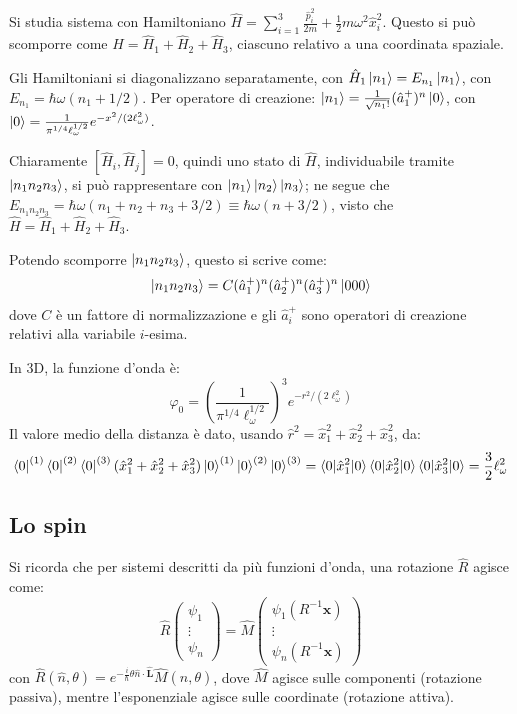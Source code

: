 \documentclass[11pt, a4paper]{scrartcl} %
\numberwithin{equation}{subsection}
\theoremstyle{style2}
\theoremstyle{style1}
\begin{document}
Si studia sistema con Hamiltoniano $\hat{H}= \sum_{i=1}^{3} \frac{\hat{p}_i^2}{2m} + \frac{1}{2} m\omega^2 \hat{x}_i^2$. Questo si pu\`o scomporre come $\hat{H} = \hat{H}_1 + \hat{H}_2 + \hat{H}_3$, ciascuno relativo a una coordinata spaziale.

Gli Hamiltoniani si diagonalizzano separatamente, con $\hat{H}_1 \ket{n_1}  = E_{n_1}  \ket{n_1} $, con $E_{n_1} = \hbar  \omega (n_1 + 1 / 2)$. Per operatore di creazione: $\ket{n_1} = \frac{1}{\sqrt{n_1} !} (\hat{a}_1^{+})^n  \ket{0} $, con $\ket{0}  = \frac{1}{\pi^{ 1/4} \ell _\omega ^{1 / 2}}   e^{ - x^2 / (2 \ell _\omega^{2})} $.

Chiaramente $[\hat{H}_i, \hat{H}_j] = 0$, quindi uno stato di $\hat{H}$, individuabile tramite $\ket{ n_1 n_2n_3} $, si pu\`o rappresentare con $\ket{n_1} \ket{n_2} \ket{n_3} $; ne segue che $E_{n_1n_2n_3} = \hbar \omega(n_1+n_2+n_3 + 3 / 2) \equiv \hbar \omega (n+ 3 / 2)$, visto che $\hat{H}= \hat{H}_1 + \hat{H}_2 +\hat{H}_3$.

Potendo scomporre $\ket{n_1n_2n_3} $, questo si scrive come:
\[
\ket{n_1n_2n_3} = C (\hat{a}_1^+)^n(\hat{a}_2^+)^n(\hat{a}_3^+)^n \ket{0 0 0} 
\] 
dove $C $ \`e un fattore di normalizzazione e gli $\hat{a}_i^+$ sono operatori di creazione relativi alla variabile $i$-esima.

In 3D, la funzione d'onda \`e:
\begin{equation}
	\varphi _0 = \left(\frac{1}{\pi^{1 / 4} \ell _\omega^{1 / 2} }\right) ^3 e^{- r^2 / (2\ell _\omega^2)} 
\end{equation}
Il valore medio della distanza \`e dato, usando $\hat{r}^2 = \hat{x}^2_1 + \hat{x}_2^2 + \hat{x}^2_3$, da:
\[
	\bra{0} ^{(1)} \bra{0} ^{(2)} \bra{0}^{(3)} ( \hat{x}_1^2 + \hat{x}_2^2 + \hat{x}_3^2 )\ket{0} ^{(1)}  \ket{0} ^{(2)} \ket{0} ^{(3)} = \braket{0|\hat{x}_1^2|0} \braket{0|\hat{x}_2^2|0} \braket{0|\hat{x}_3^2|0} =\frac{3}{2}\ell _\omega^2
\] 

\subsection{Lo spin}
Si ricorda che per sistemi descritti da pi\`u funzioni d'onda, una rotazione $\hat{R}$ agisce come:
\[
\hat{R} \begin{pmatrix} \psi_1 \\ \vdots\\ \psi _n \end{pmatrix} = \hat{M} \begin{pmatrix} \psi _1(R^{-1} \mathbf{x} ) \\ \vdots \\ \psi _n(R^{-1} \mathbf{x} )\end{pmatrix} 
\] 
con $\hat{R}(\hat{n},\theta ) = e^{- \frac{i}{\hbar } \theta  \hat{n}\cdot \hat{\mathbf{L}} } \hat{M}(\hat{n},\theta ) $, dove $\hat{M}$ agisce sulle componenti (rotazione passiva), mentre l'esponenziale agisce sulle coordinate (rotazione attiva).
\end{document}

